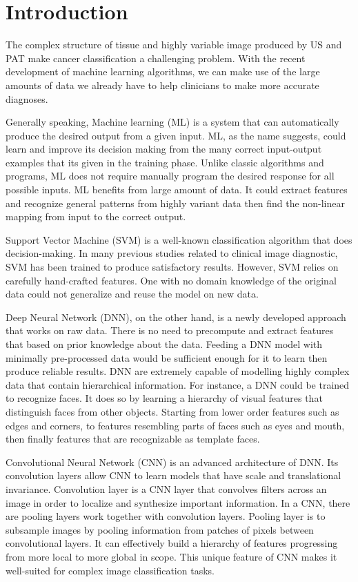 \chapter{Introduction} %

The complex structure of tissue and highly variable image produced by US and PAT make cancer classification a challenging problem. With the recent development of machine learning algorithms, we can make use of the large amounts of data we already have to help clinicians to make more accurate diagnoses. 

Generally speaking, Machine learning (ML) is a system that can automatically produce the desired output from a given input. ML, as the name suggests, could learn and improve its decision making from the many correct input-output examples that its given in the training phase. Unlike classic algorithms and programs, ML does not require manually program the desired response for all possible inputs. ML benefits from large amount of data. It could extract features and recognize general patterns from highly variant data then find the non-linear mapping from input to the correct output. 

Support Vector Machine (SVM) is a well-known classification algorithm that does decision-making. In many previous studies related to clinical image diagnostic, SVM has been trained to produce satisfactory results. However, SVM relies on carefully hand-crafted features. One with no domain knowledge of the original data could not generalize and reuse the model on new data.

Deep Neural Network (DNN), on the other hand, is a newly developed approach that works on raw data. There is no need to precompute and extract features that based on prior knowledge about the data. Feeding a DNN model with minimally pre-processed data would be sufficient enough for it to learn then produce reliable results. DNN are extremely capable of modelling highly complex data that contain hierarchical information. For instance, a DNN could be trained to recognize faces. It does so by learning a hierarchy of visual features that distinguish faces from other objects. Starting from lower order features such as edges and corners, to features resembling parts of faces such as eyes and mouth, then finally features that are recognizable as template faces.

Convolutional Neural Network (CNN) is an advanced architecture of DNN. Its convolution layers allow CNN to learn models that have scale and translational invariance. Convolution layer is a CNN layer that convolves filters across an image in order to localize and synthesize important information. In a CNN, there are pooling layers work together with convolution layers. Pooling layer is to subsample images by pooling information from patches of pixels between convolutional layers. It can effectively build a hierarchy of features progressing from more local to more global in scope. This unique feature of CNN makes it well-suited for complex image classification tasks.

